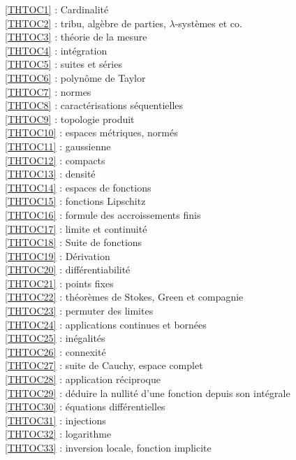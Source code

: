 \ref {THTOC1} : Cardinalité\\
\ref {THTOC2} : tribu, algèbre de parties, \( \lambda \)-systèmes et co.\\
\ref {THTOC3} : théorie de la mesure\\
\ref {THTOC4} : intégration\\
\ref {THTOC5} : suites et séries\\
\ref {THTOC6} : polynôme de Taylor\\
\ref {THTOC7} : normes\\
\ref {THTOC8} : caractérisations séquentielles\\
\ref {THTOC9} : topologie produit\\
\ref {THTOC10} : espaces métriques, normés\\
\ref {THTOC11} : gaussienne\\
\ref {THTOC12} : compacts\\
\ref {THTOC13} : densité\\
\ref {THTOC14} : espaces de fonctions\\
\ref {THTOC15} : fonctions Lipschitz\\
\ref {THTOC16} : formule des accroissements finis\\
\ref {THTOC17} : limite et continuité\\
\ref {THTOC18} : Suite de fonctions\\
\ref {THTOC19} : Dérivation\\
\ref {THTOC20} : différentiabilité\\
\ref {THTOC21} : points fixes\\
\ref {THTOC22} : théorèmes de Stokes, Green et compagnie\\
\ref {THTOC23} : permuter des limites\\
\ref {THTOC24} : applications continues et bornées\\
\ref {THTOC25} : inégalités\\
\ref {THTOC26} : connexité\\
\ref {THTOC27} : suite de Cauchy, espace complet\\
\ref {THTOC28} : application réciproque\\
\ref {THTOC29} : déduire la nullité d'une fonction depuis son intégrale\\
\ref {THTOC30} : équations différentielles\\
\ref {THTOC31} : injections\\
\ref {THTOC32} : logarithme\\
\ref {THTOC33} : inversion locale, fonction implicite\\
